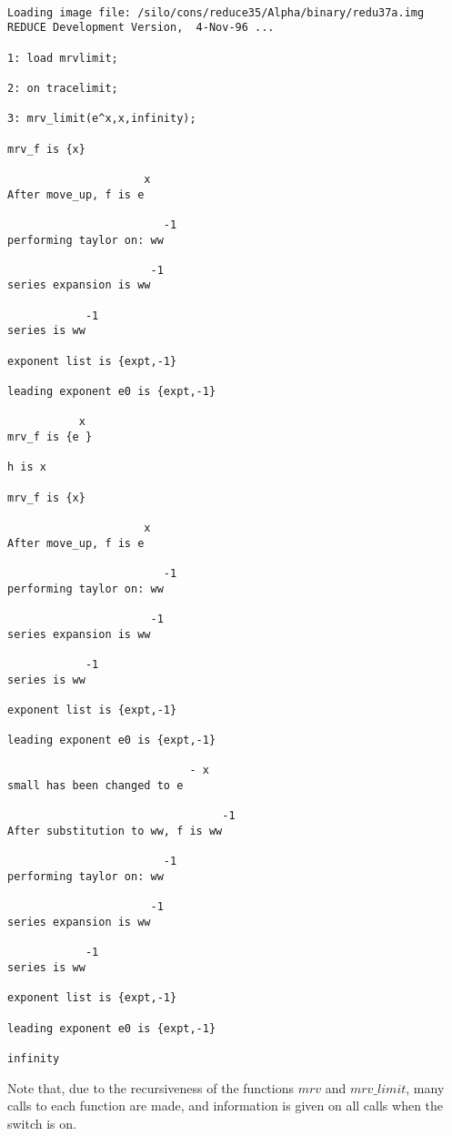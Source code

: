 \begin{verbatim}

Loading image file: /silo/cons/reduce35/Alpha/binary/redu37a.img
REDUCE Development Version,  4-Nov-96 ...

1: load mrvlimit;

2: on tracelimit;

3: mrv_limit(e^x,x,infinity);

mrv_f is {x}

                     x
After move_up, f is e

                        -1
performing taylor on: ww

                      -1
series expansion is ww

            -1
series is ww

exponent list is {expt,-1}

leading exponent e0 is {expt,-1}

           x
mrv_f is {e }

h is x

mrv_f is {x}

                     x
After move_up, f is e

                        -1
performing taylor on: ww

                      -1
series expansion is ww

            -1
series is ww

exponent list is {expt,-1}

leading exponent e0 is {expt,-1}

                            - x
small has been changed to e

                                 -1
After substitution to ww, f is ww

                        -1
performing taylor on: ww   

                      -1
series expansion is ww

            -1
series is ww

exponent list is {expt,-1}

leading exponent e0 is {expt,-1}

infinity
\end{verbatim}
\vspace{10 mm}
Note that, due to the recursiveness of the functions $mrv$ and $mrv\_limit$, many calls to each function are made, and information is given on all calls when the  switch is on.


